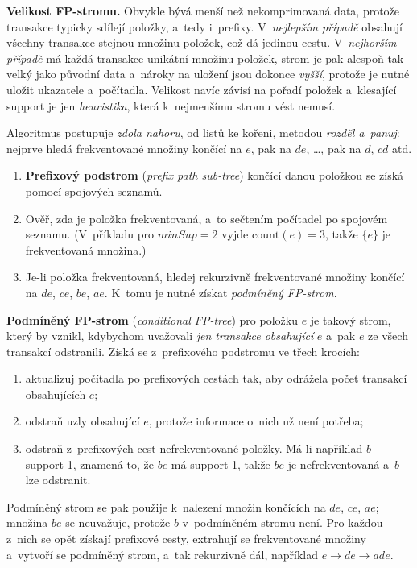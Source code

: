 \documentclass[11pt,a4paper]{article}
\theoremstyle{definition}
\begin{document}
\textbf{Velikost FP-stromu.} Obvykle bývá menší než nekomprimovaná data, protože transakce
typicky sdílejí položky, a~tedy i~prefixy. V~\emph{nejlepším případě} obsahují všechny
transakce stejnou množinu položek, což dá jedinou cestu. V~\emph{nejhorším případě} má každá
transakce unikátní množinu položek, strom je pak alespoň tak velký jako původní data a~nároky
na uložení jsou dokonce \emph{vyšší}, protože je nutné uložit ukazatele a~počítadla. Velikost
navíc závisí na pořadí položek a~klesající support je jen \emph{heuristika}, která
k~nejmenšímu stromu vést nemusí.

\begin{defbox}
Algoritmus postupuje \emph{zdola nahoru}, od listů ke kořeni, metodou \emph{rozděl a~panuj}:
nejprve hledá frekventované množiny končící na $e$, pak na $de$, \dots, pak na $d$, $cd$
atd.

\begin{enumerate}
\item \textbf{Prefixový podstrom} (\emph{prefix path sub-tree}) končící danou položkou se
      získá pomocí spojových seznamů.
\item Ověř, zda je položka frekventovaná, a~to sečtením počítadel po spojovém seznamu.
      (V~příkladu pro $\mathit{minSup}=2$ vyjde $\mathrm{count}(e)=3$, takže $\{e\}$ je
      frekventovaná množina.)
\item Je-li položka frekventovaná, hledej rekurzivně frekventované množiny končící na
      $de$, $ce$, $be$, $ae$. K~tomu je nutné získat \emph{podmíněný FP-strom}.
\end{enumerate}

\textbf{Podmíněný FP-strom} (\emph{conditional FP-tree}) pro položku $e$ je takový strom,
který by vznikl, kdybychom uvažovali \emph{jen transakce obsahující} $e$ a~pak $e$ ze všech
transakcí odstranili. Získá se z~prefixového podstromu ve třech krocích:
\begin{enumerate}
\item aktualizuj počítadla po prefixových cestách tak, aby odrážela počet transakcí
      obsahujících $e$;
\item odstraň uzly obsahující $e$, protože informace o~nich už není potřeba;
\item odstraň z~prefixových cest nefrekventované položky. Má-li například $b$ support 1,
      znamená to, že $be$ má support 1, takže $be$ je nefrekventovaná a~$b$ lze odstranit.
\end{enumerate}
Podmíněný strom se pak použije k~nalezení množin končících na $de$, $ce$, $ae$; množina $be$
se neuvažuje, protože $b$ v~podmíněném stromu není. Pro každou z~nich se opět získají
prefixové cesty, extrahují se frekventované množiny a~vytvoří se podmíněný strom, a~tak
rekurzivně dál, například $e\to de\to ade$.
\end{defbox}
\end{document}
